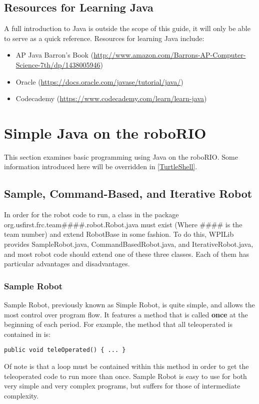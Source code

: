 \documentclass[]{report}
\begin{document}
\subsection{Resources for Learning Java}
A full introduction to Java is outside the scope of this guide, it will only be able to serve as a quick reference.
Resources for learning Java include:
\begin{itemize}
\item AP Java Barron's Book (\url{http://www.amazon.com/Barrons-AP-Computer-Science-7th/dp/1438005946})
\item Oracle (\url{https://docs.oracle.com/javase/tutorial/java/})
\item Codecademy (\url{https://www.codecademy.com/learn/learn-java})
\end{itemize}

\section{Simple Java on the roboRIO}
\label{SimpleJavaontheroboRIO}
This section examines basic programming using Java on the roboRIO.
Some information introduced here will be overridden in \ref{TurtleShell}.

\subsection{Sample, Command-Based, and Iterative Robot}
\label{samplecommanditerative}
In order for the robot code to run, a class in the package org.usfirst.frc.team\#\#\#\#.robot.Robot.java must exist (Where \#\#\#\# is the team number) and extend RobotBase in some fashion.
To do this, WPILib provides SampleRobot.java, CommandBasedRobot.java, and IterativeRobot.java, and most robot code should extend one of these three classes.
Each of them has particular advantages and disadvantages.

\subsubsection{Sample Robot}
Sample Robot, previously known as Simple Robot, is quite simple, and allows the most control over program flow.
It features a method that is called \textbf{once} at the beginning of each period.
For example, the method that all teleoperated is contained in is:
\begin{lstlisting}
public void teleOperated() { ... }
\end{lstlisting}
Of note is that a loop must be contained within this method in order to get the teleoperated code to run more than once.
Sample Robot is easy to use for both very simple and very complex programs, but suffers for those of intermediate complexity.
\end{document}
